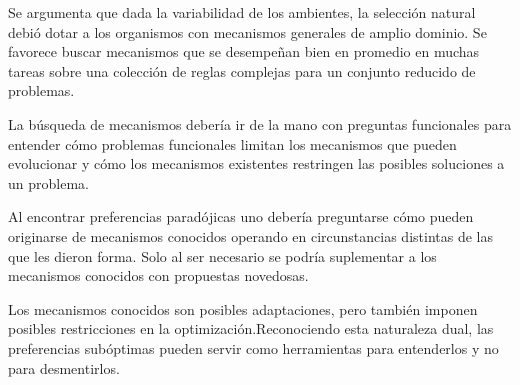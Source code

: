\documentclass[a4paper,12pt]{article}
\begin{document}
Se argumenta que dada la variabilidad de los ambientes, la selección natural debió dotar a los organismos con mecanismos generales de amplio dominio. Se favorece buscar mecanismos que se desempeñan bien en promedio en muchas tareas sobre una colección de reglas complejas para un conjunto reducido de problemas.

La búsqueda de mecanismos debería ir de la mano con preguntas funcionales para entender cómo problemas funcionales limitan los mecanismos que pueden evolucionar y cómo los mecanismos existentes restringen las posibles soluciones a un problema.

Al encontrar preferencias paradójicas uno debería preguntarse cómo pueden originarse de mecanismos conocidos operando en circunstancias distintas de las que les dieron forma. Solo al ser necesario se podría suplementar a los mecanismos conocidos con propuestas novedosas.

Los mecanismos conocidos son posibles adaptaciones, pero también imponen posibles restricciones en la optimización.Reconociendo esta naturaleza dual, las preferencias subóptimas pueden servir como herramientas para entenderlos y no para desmentirlos.
\end{document}
